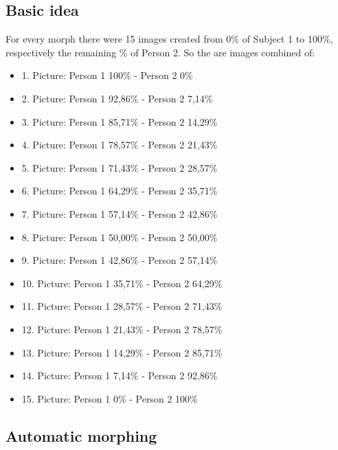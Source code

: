 \subsection{Basic idea}
\label{percentageMorph}
For every morph there were 15 images created from 0\% of Subject 1 to 100\%, respectively the remaining \% of Person 2. So the are images combined of:
\begin{itemize}
	\item 1. Picture: Person 1 100\% - Person 2 0\%
	\item 2. Picture: Person 1 92,86\% - Person 2 7,14\%
	\item 3. Picture: Person 1 85,71\% - Person 2 14,29\%
	\item 4. Picture: Person 1 78,57\% - Person 2 21,43\%
	\item 5. Picture: Person 1 71,43\% - Person 2 28,57\%
	\item 6. Picture: Person 1 64,29\% - Person 2 35,71\%
	\item 7. Picture: Person 1 57,14\% - Person 2 42,86\%
	\item 8. Picture: Person 1 50,00\% - Person 2 50,00\%
	\item 9. Picture: Person 1 42,86\% - Person 2 57,14\%
	\item 10. Picture: Person 1 35,71\% - Person 2 64,29\%
	\item 11. Picture: Person 1 28,57\% - Person 2 71,43\%
	\item 12. Picture: Person 1 21,43\% - Person 2 78,57\%
	\item 13. Picture: Person 1 14,29\% - Person 2 85,71\%
	\item 14. Picture: Person 1 7,14\% - Person 2 92,86\%
	\item 15. Picture: Person 1 0\% - Person 2 100\%
	\end{itemize}

\subsection{Automatic morphing}
\label{automatic_morph}


